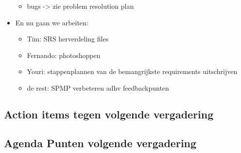 \begin{itemize}
\begin{itemize}
	\item bugs -> zie problem resolution plan
	\end{itemize}
\item En nu gaan we arbeiten:
	\begin{itemize}
	\item Tim: SRS herverdeling files
	\item Fernando: photoshoppen
	\item Youri: stappenplannen van de bemangrijkste requirements uitschrijven
	\item de rest: SPMP verbeteren adhv feedbackpunten
	\end{itemize}
\end{itemize}
\subsection{Action items tegen volgende vergadering}
\subsection{Agenda Punten volgende vergadering}

